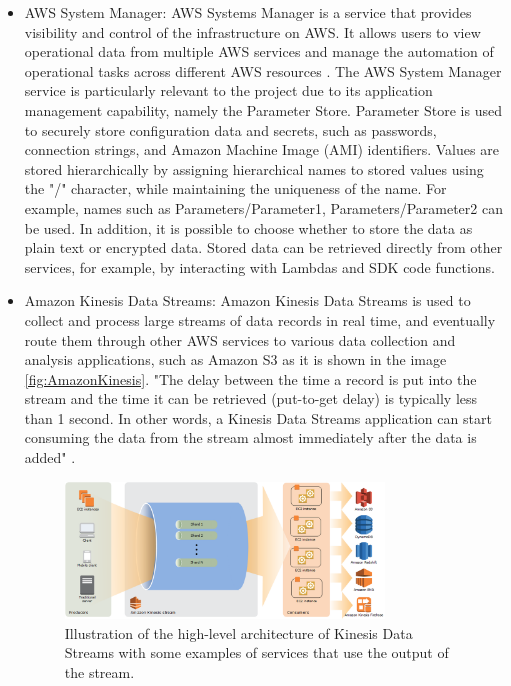 \begin{itemize}
    \item AWS System Manager: AWS Systems Manager is a service that provides visibility and control of the infrastructure on AWS.  It allows users to view operational data from multiple AWS services and manage the automation of operational tasks across different AWS resources \cite{AWSSM}. The AWS System Manager service is particularly relevant to the project due to its application management capability, namely the Parameter Store. Parameter Store is used to securely store configuration data and secrets, such as passwords, connection strings, and Amazon Machine Image (AMI) identifiers. Values are stored hierarchically by assigning hierarchical names to stored values using the "/" character, while maintaining the uniqueness of the name. For example, names such as Parameters/Parameter1, Parameters/Parameter2 can be used. In addition, it is possible to choose whether to store the data as plain text or encrypted data. Stored data can be retrieved directly from other services, for example, by interacting with Lambdas and SDK code functions.
    \item Amazon Kinesis Data Streams: Amazon Kinesis Data Streams is used to collect and process large streams of data records in real time, and eventually route them through other AWS services to various data collection and analysis applications, such as Amazon S3 as it is shown in the image \ref{fig:AmazonKinesis}. "The delay between the time a record is put into the stream and the time it can be retrieved (put-to-get delay) is typically less than 1 second. In other words, a Kinesis Data Streams application can start consuming the data from the stream almost immediately after the data is added" \cite{AWSKinesis}.
    \begin{figure}[h]  %
        \centering
        \includegraphics[width=0.8\textwidth]{images/AmazonKinesis.png}  %
        \caption{Illustration of the high-level architecture of Kinesis Data Streams with some examples of services that use the output of the stream. \cite{AmazonKinesis}}

\end{figure}
\end{itemize}
